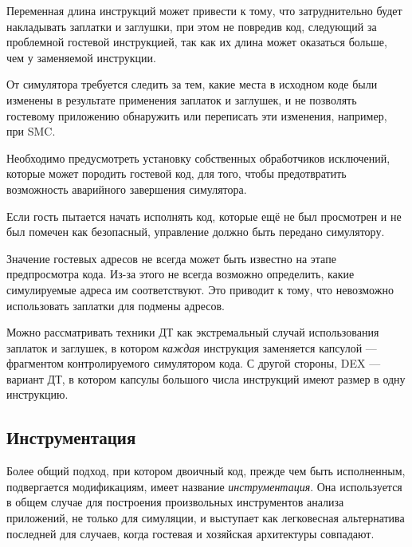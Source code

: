 \begin{itemize*}
    \item Переменная длина инструкций может привести к тому, что затруднительно будет накладывать заплатки и заглушки, при этом не повредив код, следующий за проблемной гостевой инструкцией, так как их длина может оказаться больше, чем у заменяемой инструкции.
    \item   От симулятора требуется следить за тем, какие места в исходном коде были изменены в результате применения заплаток и заглушек, и не позволять гостевому приложению обнаружить или переписать эти изменения, например, при SMC.
   \item Необходимо предусмотреть установку собственных обработчиков исключений, которые может породить гостевой код, для того, чтобы предотвратить возможность аварийного завершения симулятора. 
   \item Если гость пытается начать исполнять код, которые ещё не был просмотрен и не был помечен как безопасный, управление должно быть передано симулятору.
   \item Значение гостевых адресов не всегда может быть известно на этапе предпросмотра кода. Из-за этого не всегда возможно определить, какие симулируемые адреса им соответствуют. Это приводит к тому, что невозможно использовать заплатки для подмены адресов.
\end{itemize*}

\begin{digression}
Можно рассматривать техники ДТ как экстремальный случай использования заплаток и заглушек, в котором \emph{каждая} инструкция заменяется капсулой --- фрагментом контролируемого симулятором кода. С другой стороны, DEX --- вариант ДТ, в котором капсулы большого числа инструкций имеют размер в одну инструкцию.
\end{digression}

\subsection{Инструментация}

Более общий подход, при котором двоичный код, прежде чем быть исполненным, подвергается модификациям, имеет название \textit{инструментация}. Она используется в общем случае для построения произвольных инструментов анализа приложений, не только для симуляции, и выступает как легковесная альтернатива последней для случаев, когда гостевая и хозяйская архитектуры совпадают.

